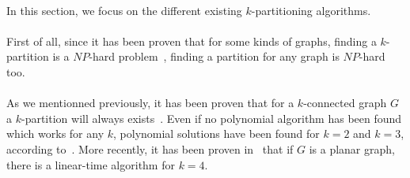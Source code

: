 \paragraph{}
In this section, we focus on the different existing
$k$-partitioning algorithms.

\paragraph{}
First of all, since it has been proven that for some kinds of graphs, finding a
$k$-partition is a $NP$-hard problem~\cite{BF06}, finding a partition for any
graph is $NP$-hard too.

\paragraph{}
As we mentionned previously, it has been proven that for a $k$-connected graph
$G$ a $k$-partition will always exists~\cite{GE78,LL77}. Even if no polynomial
algorithm has been found which works for any $k$, polynomial solutions have
been found for $k=2$ and $k=3$, according to~\cite{JS94}. More recently, it has
been proven in~\cite{Nakano1997315} that if $G$ is a planar graph, there is a
linear-time algorithm for $k = 4$.


